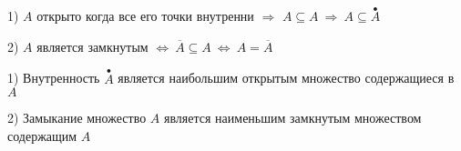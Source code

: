 \begin{theorem}
  1) $A$ открыто когда все его точки внутренни $\Rightarrow$ $A \subseteq A
  ~ \Rightarrow ~ A \subseteq \stackrel{\bullet}{A}$

  2) $A$ является замкнутым $\Leftrightarrow ~ \overline{A} \subseteq A ~
  \Leftrightarrow ~ A = \overline{A}$
\end{theorem}

\begin{theorem}
  1) Внутренность $\stackrel{\bullet}{A}$ является наибольшим открытым множество
  содержащиеся в $A$

  2) Замыкание множество $A$ является наименьшим замкнутым множеством
  содержащим $A$
\end{theorem}
